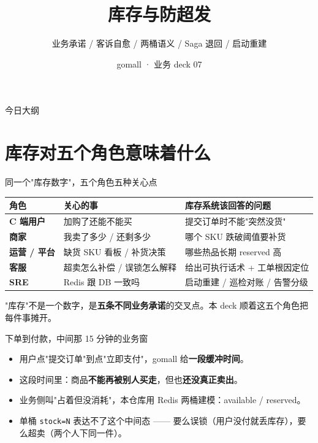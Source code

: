 \documentclass[aspectratio=169,11pt]{beamer}
\title{库存与防超发}
\subtitle{业务承诺 / 客诉自愈 / 两桶语义 / Saga 退回 / 启动重建}
\author{gomall · 业务 deck 07}
\date{}
\begin{document}
\maketitle

\begin{frame}[shrink]{今日大纲}
\tableofcontents
\end{frame}

\section{库存对五个角色意味着什么}

\begin{frame}[shrink]{同一个"库存数字"，五个角色五种关心点}
\begin{tabular}{@{}lp{3.0cm}p{5.2cm}@{}}
\toprule
角色 & 关心的事 & 库存系统该回答的问题 \\
\midrule
\textbf{C 端用户}    & 加购了还能不能买       & 提交订单时不能"突然没货" \\
\textbf{商家}        & 我卖了多少 / 还剩多少 & 哪个 SKU 跌破阈值要补货 \\
\textbf{运营 / 平台} & 缺货 SKU 看板 / 补货决策 & 哪些热品长期 reserved 高 \\
\textbf{客服}        & 超卖怎么补偿 / 误锁怎么解释 & 给出可执行话术 + 工单根因定位 \\
\textbf{SRE}         & Redis 跟 DB 一致吗     & 启动重建 / 巡检对账 / 告警分级 \\
\bottomrule
\end{tabular}
\vspace{2mm}
\small "库存"不是一个数字，是\textbf{五条不同业务承诺}的交叉点。本 deck 顺着这五个角色把每件事摊开。
\end{frame}

\begin{frame}[shrink]{下单到付款，中间那 15 分钟的业务窗}
\begin{itemize}
  \item 用户点"提交订单"到点"立即支付"，gomall 给\textbf{一段缓冲时间}。
  \item 这段时间里：商品\textbf{不能再被别人买走}，但也\textbf{还没真正卖出}。
  \item 业务侧叫"占着但没消耗"，本仓库用 Redis 两桶建模：available / reserved。
  \item 单桶 \texttt{stock=N} 表达不了这个中间态 —— 要么误锁（用户没付就丢库存），要么超卖（两个人下同一件）。
\end{itemize}
\end{frame}
\end{document}
